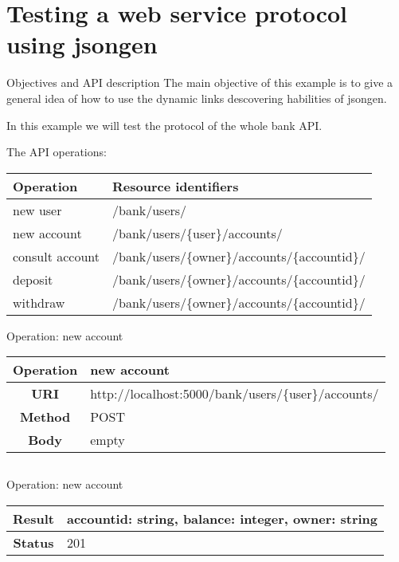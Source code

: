 \section{Testing a web service protocol using jsongen}

\begin{frame}{Objectives and API description}
  The main objective of this example is to give a general idea of how
  to use the dynamic links descovering habilities of jsongen.

  In this example we will test the protocol of the whole bank API.

  The API operations:

  \centering
  \begin{tabular}{| l | l |}
    \hline
    \textbf{Operation} & \textbf{Resource identifiers} \\ \hline
    new user           & /bank/users/                  \\ \hline
    new account        & /bank/users/\{user\}/accounts/  \\ \hline
    consult account    & /bank/users/\{owner\}/accounts/\{accountid\}/ \\ \hline
    deposit            & /bank/users/\{owner\}/accounts/\{accountid\}/ \\ \hline
    withdraw           & /bank/users/\{owner\}/accounts/\{accountid\}/ \\ \hline
  \end{tabular}
  \centering

\end{frame}

\begin{frame}{Operation: new account}
  \centering
  \begin{tabular}{| c | l |}
    \hline
    \textbf{Operation} & new account \\ \hline
    \textbf{URI}       & http://localhost:5000/bank/users/\{user\}/accounts/ \\ \hline
    \textbf{Method}    & POST     \\ \hline
    \textbf{Body}      & empty    \\ \hline
  \end{tabular}
  \centering
  \inputminted{js}{./code/example2_new_account.jsch}
\end{frame}

\begin{frame}{Operation: new account}
  \centering
  \begin{tabular}{| c | l |}
    \hline
    \textbf{Result}    & accountid: string, balance: integer, owner: string\\ \hline
    \textbf{Status}    & 201 \\ \hline
  \end{tabular}
  \centering
  \inputminted{js}{./code/example2_new_account_response.jsch}
\end{frame}

